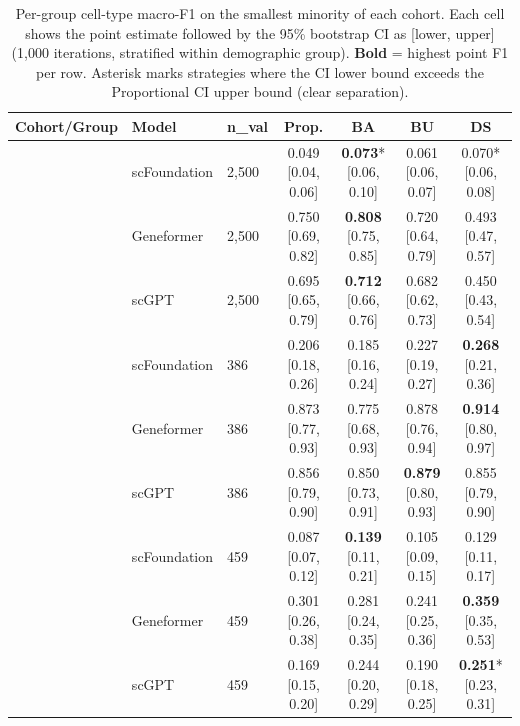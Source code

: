 \documentclass[sigconf]{acmart}
\begin{document}
\begin{table}[t]
\caption{Per-group cell-type macro-F1 on the smallest minority of each cohort. Each cell shows the point estimate followed by the 95\% bootstrap CI as [lower, upper] (1{,}000 iterations, stratified within demographic group). \textbf{Bold} = highest point F1 per row. Asterisk marks strategies where the CI lower bound exceeds the Proportional CI upper bound (clear separation).}
\label{tab:bootstrap_min}
\centering
\small
\begin{tabular}{lll cccc}
\toprule
\textbf{Cohort/Group} & \textbf{Model} & \textbf{n\_val} & Prop. & BA & BU & DS \\
\midrule
{}
 & scFoundation & 2{,}500 & 0.049 [0.04, 0.06] & \textbf{0.073}* [0.06, 0.10] & 0.061 [0.06, 0.07] & 0.070* [0.06, 0.08] \\
 & Geneformer   & 2{,}500 & 0.750 [0.69, 0.82] & \textbf{0.808} [0.75, 0.85] & 0.720 [0.64, 0.79] & 0.493 [0.47, 0.57] \\
 & scGPT        & 2{,}500 & 0.695 [0.65, 0.79] & \textbf{0.712} [0.66, 0.76] & 0.682 [0.62, 0.73] & 0.450 [0.43, 0.54] \\
\midrule
{}
 & scFoundation & 386 & 0.206 [0.18, 0.26] & 0.185 [0.16, 0.24] & 0.227 [0.19, 0.27] & \textbf{0.268} [0.21, 0.36] \\
 & Geneformer   & 386 & 0.873 [0.77, 0.93] & 0.775 [0.68, 0.93] & 0.878 [0.76, 0.94] & \textbf{0.914} [0.80, 0.97] \\
 & scGPT        & 386 & 0.856 [0.79, 0.90] & 0.850 [0.73, 0.91] & \textbf{0.879} [0.80, 0.93] & 0.855 [0.79, 0.90] \\
\midrule
{}
 & scFoundation & 459 & 0.087 [0.07, 0.12] & \textbf{0.139} [0.11, 0.21] & 0.105 [0.09, 0.15] & 0.129 [0.11, 0.17] \\
 & Geneformer   & 459 & 0.301 [0.26, 0.38] & 0.281 [0.24, 0.35] & 0.241 [0.25, 0.36] & \textbf{0.359} [0.35, 0.53] \\
 & scGPT        & 459 & 0.169 [0.15, 0.20] & 0.244 [0.20, 0.29] & 0.190 [0.18, 0.25] & \textbf{0.251}* [0.23, 0.31] \\
\bottomrule
\end{tabular}
\end{table}
\end{document}
